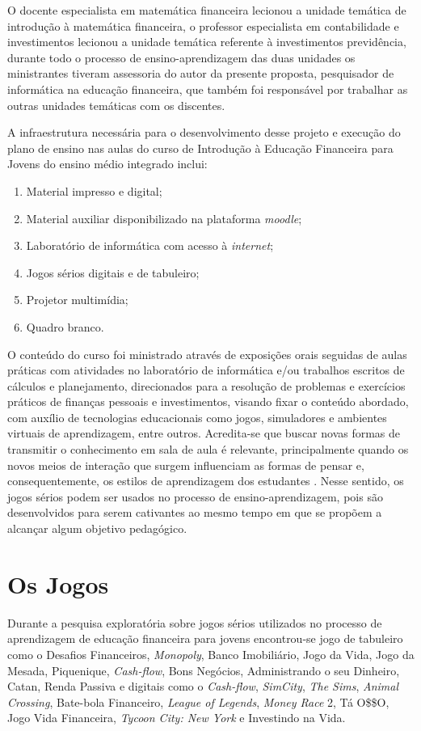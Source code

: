O docente especialista em matemática financeira lecionou a unidade temática de introdução à matemática financeira, o professor especialista em contabilidade e investimentos lecionou a unidade temática referente à investimentos previdência, durante todo o processo de ensino-aprendizagem das duas unidades os ministrantes tiveram assessoria do autor da presente proposta, pesquisador de informática na educação financeira, que também foi responsável por trabalhar as outras unidades temáticas com os discentes.

A infraestrutura necessária para o desenvolvimento desse projeto e execução do plano de ensino nas aulas do curso de Introdução à Educação Financeira para Jovens do ensino médio integrado inclui:

\begin{enumerate}
    \item Material impresso e digital;
    \item Material auxiliar disponibilizado na plataforma \textit{moodle};
    \item Laboratório de informática com acesso à \textit{internet};
    \item Jogos sérios digitais e de tabuleiro;
    \item Projetor multimídia;
    \item Quadro branco.
\end{enumerate}

O conteúdo do curso foi ministrado através de exposições orais seguidas de aulas práticas com atividades no laboratório de informática e/ou trabalhos escritos de cálculos e planejamento, direcionados para a resolução de problemas e exercícios práticos de finanças pessoais e investimentos, visando fixar o conteúdo abordado, com auxílio de tecnologias educacionais como jogos, simuladores e ambientes virtuais de aprendizagem, entre outros. Acredita-se que buscar novas formas de transmitir o conhecimento em sala de aula é relevante, principalmente quando os novos meios de interação que surgem influenciam as formas de pensar e, consequentemente, os estilos de aprendizagem dos estudantes \cite{prensky2012}. Nesse sentido, os jogos sérios podem ser usados no processo de ensino-aprendizagem, pois são desenvolvidos para serem cativantes ao mesmo tempo em que se propõem a alcançar algum objetivo pedagógico.

\section{Os Jogos}
Durante a pesquisa exploratória sobre jogos sérios utilizados no processo de aprendizagem de educação financeira para jovens encontrou-se jogo de tabuleiro como o Desafios Financeiros, \textit{Monopoly}, Banco Imobiliário, Jogo da Vida, Jogo da Mesada, Piquenique, \textit{Cash-flow}, Bons Negócios, Administrando o seu Dinheiro, Catan, Renda Passiva e digitais como o \textit{Cash-flow}, \textit{SimCity}, \textit{The Sims}, \textit{Animal Crossing}, Bate-bola Financeiro, \textit{League of Legends}, \textit{Money Race} 2, Tá O{\$\$}O,  Jogo Vida Financeira, \textit{Tycoon City: New York} e Investindo na Vida.

